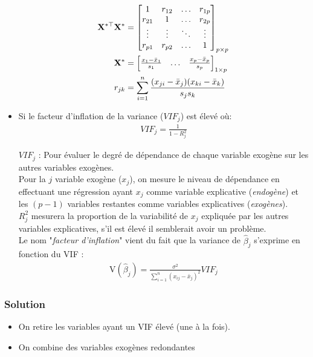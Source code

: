 \documentclass[10pt, french]{article}
\begin{document}
\begin{multicols*}{3}
\begin{itemize}
\begin{align*}
\mathbf{X^{*\top}X^{*}} &= 
	\begin{bmatrix}
		1	&	r_{12}	&	\dots	&	r_{1p}	\\
		r_{21}	&	1	&	\dots	&	r_{2p}	\\
		\vdots	&	\vdots	&	\ddots	&	\vdots	\\
		r_{p1}	&	r_{p2}	&	\dots	&	1	\\		
	\end{bmatrix}_{p \times p} \\
\mathbf{X^*} &= 
	\begin{bmatrix}
		\frac{x_1 - \bar{x}_1}{s_1} & \dots & \frac{x_p - \bar{x}_p}{s_p}
	\end{bmatrix}_{1 \times p} \\
r_{jk} &= \sum_{i = 1}^{n}\frac{(x_{ji} - \bar{x}_{j})(x_{ki} - \bar{x}_{k})}{s_{j}s_{k}} 
\end{align*}
\item Si le facteur d'inflation de la variance ($VIF_j$) est élevé où:
\begin{align*}
VIF_j = \frac{1}{1 - R_j^2}
\end{align*}
\item[$VIF_j$ :] Pour évaluer le degré de dépendance de chaque variable exogène sur les autres variables exogènes.\\
Pour la $j$ variable exogène ($x_j$), on mesure le niveau de dépendance en effectuant une régression ayant $x_j$ comme variable explicative (\textit{endogène}) et les $(p - 1)$ variables restantes comme variables explicatives (\textit{exogènes}).\\
$R_j^2$ mesurera la proportion de la variabilité de $x_j$ expliquée par les autres variables explicatives, s'il est élevé il semblerait avoir un problème.\\
Le nom "\textit{facteur d'inflation}" vient du fait que la variance de $\hat{\beta}_j$ s'exprime en fonction du VIF :
\begin{align*}
	\text{V}(\hat{\beta}_j) = \frac{\sigma^2}{\sum_{i = 1}^{n}(x_{ij} - \bar{x}_{j})^{2}} VIF_j
\end{align*}
\end{itemize}

\subsubsection*{Solution}
\begin{itemize}
	\item On retire les variables ayant un VIF élevé (une à la fois).
	\item On combine des variables exogènes redondantes	
\end{itemize}


\end{multicols*}
\end{document}
